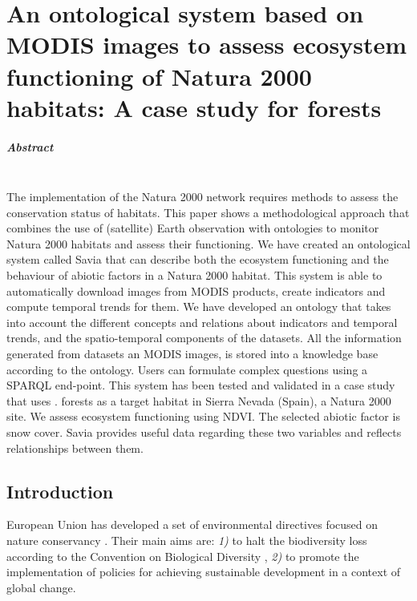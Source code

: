 %
\chapter{An ontological system based on MODIS images to assess ecosystem functioning of Natura 2000 habitats: A case study for \Qp forests}\label{sec:multivar}

\newpage

\paragraph{Abstract} \mbox{} \\
The implementation of the Natura 2000 network requires methods to assess the conservation status of habitats. This paper shows a methodological approach that combines the use of (satellite) Earth observation with ontologies to monitor Natura 2000 habitats and assess their functioning. We have created an ontological system called Savia that can describe both the ecosystem functioning and the behaviour of abiotic factors in a Natura 2000 habitat. This system is able to automatically download images from MODIS products, create indicators and compute temporal trends for them. We have developed an ontology that takes into account the different concepts and relations about indicators and temporal trends, and the spatio-temporal components of the datasets. All the information generated from datasets an MODIS images, is stored into a knowledge base according to the ontology. Users can formulate complex questions using a SPARQL end-point. This system has been tested and validated in a case study that uses \Qpw. forests as a target habitat in Sierra Nevada (Spain), a Natura 2000 site. We assess ecosystem functioning using NDVI. The selected abiotic factor is snow cover. Savia provides useful data regarding these two variables and reflects relationships between them.

\newpage

\section{Introduction}\label{sec:onto:intro}

European Union has developed a set of environmental directives focused on nature conservancy \autocite{Evans2012BuildingEuropean}. Their main aims are: \emph{1)} to halt the biodiversity loss according to the Convention on Biological Diversity \autocite{CBDSecretariatdelaConventiononBiologicalDiversity2003HandbookConvention}, \emph{2)} to promote the implementation of policies for achieving sustainable development in a context of global change.

